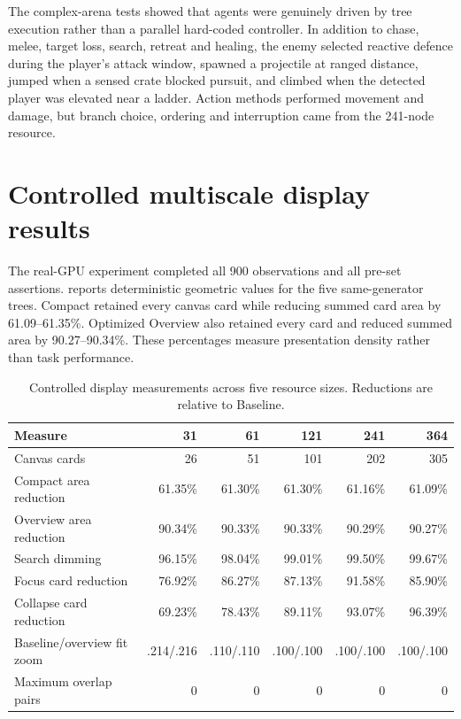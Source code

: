 The complex-arena tests showed that agents were genuinely driven by tree execution rather than a parallel hard-coded controller. In addition to chase, melee, target loss, search, retreat and healing, the enemy selected reactive defence during the player's attack window, spawned a projectile at ranged distance, jumped when a sensed crate blocked pursuit, and climbed when the detected player was elevated near a ladder. Action methods performed movement and damage, but branch choice, ordering and interruption came from the 241-node resource.

\section{Controlled multiscale display results}

The real-\ac{GPU} experiment completed all 900 observations and all pre-set assertions.  reports deterministic geometric values for the five same-generator trees. Compact retained every canvas card while reducing summed card area by 61.09--61.35\%. Optimized Overview also retained every card and reduced summed area by 90.27--90.34\%. These percentages measure presentation density rather than task performance.

\begin{table}[htbp]
\centering
\caption{Controlled display measurements across five resource sizes. Reductions are relative to Baseline.}
\label{tab:displaymain}
\small
\begin{tabular}{lrrrrr}
\toprule
Measure & 31 & 61 & 121 & 241 & 364 \\
\midrule
Canvas cards & 26 & 51 & 101 & 202 & 305 \\
Compact area reduction & 61.35\% & 61.30\% & 61.30\% & 61.16\% & 61.09\% \\
Overview area reduction & 90.34\% & 90.33\% & 90.33\% & 90.29\% & 90.27\% \\
Search dimming & 96.15\% & 98.04\% & 99.01\% & 99.50\% & 99.67\% \\
Focus card reduction & 76.92\% & 86.27\% & 87.13\% & 91.58\% & 85.90\% \\
Collapse card reduction & 69.23\% & 78.43\% & 89.11\% & 93.07\% & 96.39\% \\
Baseline/overview fit zoom & .214/.216 & .110/.110 & .100/.100 & .100/.100 & .100/.100 \\
Maximum overlap pairs & 0 & 0 & 0 & 0 & 0 \\
\bottomrule
\end{tabular}
\end{table}

